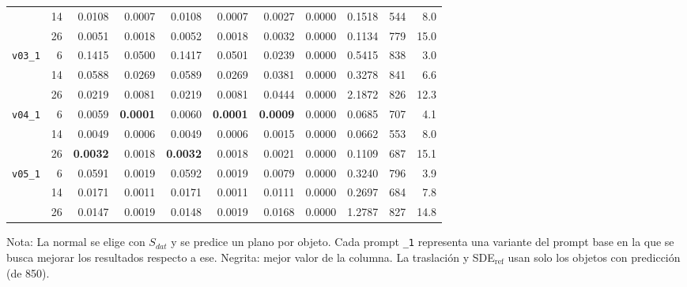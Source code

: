 \begin{table}[htbp]
\begin{lrbox}{\tablebox}
\begin{adjustbox}{max width=\textwidth}
\begin{tabular}{lrrrrrrrrrr}
 & 14 & 0.0108 & 0.0007 & 0.0108 & 0.0007 & 0.0027 & 0.0000 & 0.1518 & 544 & 8.0 \\
 & 26 & 0.0051 & 0.0018 & 0.0052 & 0.0018 & 0.0032 & 0.0000 & 0.1134 & 779 & 15.0 \\
\midrule
\multirow{3}{*}{\texttt{v03\_1}} & 6 & 0.1415 & 0.0500 & 0.1417 & 0.0501 & 0.0239 & 0.0000 & 0.5415 & 838 & 3.0 \\
 & 14 & 0.0588 & 0.0269 & 0.0589 & 0.0269 & 0.0381 & 0.0000 & 0.3278 & 841 & 6.6 \\
 & 26 & 0.0219 & 0.0081 & 0.0219 & 0.0081 & 0.0444 & 0.0000 & 2.1872 & 826 & 12.3 \\
\midrule
\multirow{3}{*}{\texttt{v04\_1}} & 6 & 0.0059 & \textbf{0.0001} & 0.0060 & \textbf{0.0001} & \textbf{0.0009} & 0.0000 & 0.0685 & 707 & 4.1 \\
 & 14 & 0.0049 & 0.0006 & 0.0049 & 0.0006 & 0.0015 & 0.0000 & 0.0662 & 553 & 8.0 \\
 & 26 & \textbf{0.0032} & 0.0018 & \textbf{0.0032} & 0.0018 & 0.0021 & 0.0000 & 0.1109 & 687 & 15.1 \\
\midrule
\multirow{3}{*}{\texttt{v05\_1}} & 6 & 0.0591 & 0.0019 & 0.0592 & 0.0019 & 0.0079 & 0.0000 & 0.3240 & 796 & 3.9 \\
 & 14 & 0.0171 & 0.0011 & 0.0171 & 0.0011 & 0.0111 & 0.0000 & 0.2697 & 684 & 7.8 \\
 & 26 & 0.0147 & 0.0019 & 0.0148 & 0.0019 & 0.0168 & 0.0000 & 1.2787 & 827 & 14.8 \\
\bottomrule
\end{tabular}
\end{adjustbox}
\end{lrbox}
\usebox{\tablebox}

\vspace{1.5ex}
\begin{minipage}{\wd\tablebox}
\footnotesize
Nota: La normal se elige con $S_{dat}$ y se predice un plano por objeto. Cada prompt \texttt{\_1} representa una variante del prompt base en la que se busca mejorar los resultados respecto a ese. Negrita: mejor valor de la columna. La traslación y SDE$_{\mathrm{ref}}$ usan solo los objetos con predicción (de 850).
\end{minipage}
\end{table}

